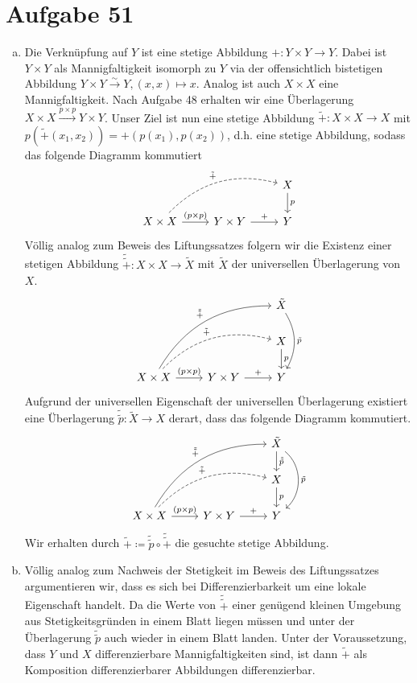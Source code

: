 \documentclass{article}
\begin{document}
\section*{Aufgabe 51}
\begin{enumerate}[(a)]
  \item Die Verknüpfung auf $Y$ ist eine stetige Abbildung $+ \colon Y \times Y \to Y$. 
  Dabei ist $Y \times Y$ als Mannigfaltigkeit isomorph zu $Y$ via der offensichtlich bistetigen Abbildung 
  $Y \times Y \xrightarrow{\sim} Y, (x,x) \mapsto x$.
  Analog ist auch $X\times X$ eine Mannigfaltigkeit. Nach Aufgabe 48 erhalten wir eine Überlagerung 
  $X \times X \xrightarrow{p\times p}Y\times Y$.
  Unser Ziel ist nun eine stetige Abbildung $\tilde{+}\colon X\times X \to X$ mit $p(\tilde{+}(x_1, x_2)) = +(p(x_1), p(x_2))$, d.h.
  eine stetige Abbildung, sodass das folgende Diagramm kommutiert 
  \[
      \begin{tikzcd}
         & & X \arrow[d, "p"]\\
         X \times X\arrow[urr, "\tilde{+}", bend left, dashed] \arrow[r, "(p\times p)"] & Y \times Y\arrow[r, "+"]  & Y
      \end{tikzcd}
  \]
  Völlig analog zum Beweis des Liftungssatzes folgern wir die Existenz einer stetigen Abbildung 
  $\tilde{\tilde{+}} \colon X \times X \to \tilde X$ mit $\tilde X$ der universellen Überlagerung von $X$.
  \[
      \begin{tikzcd}
         & & \tilde X \arrow[dd, bend left, "\tilde p"]\\
         & & X \arrow[d, "p"]\\
         X \times X\arrow[uurr, bend left, "\tilde{\tilde{+}}"] \arrow[urr, "\tilde{+}", bend left, dashed] \arrow[r, "(p\times p)"] & Y \times Y\arrow[r, "+"]  & Y
      \end{tikzcd}
  \]
  Aufgrund der universellen Eigenschaft der universellen Überlagerung existiert eine Überlagerung 
  $\tilde{\tilde{p}} \colon \tilde{X} \to X$ derart, dass das folgende Diagramm kommutiert.
  \[
      \begin{tikzcd}
         & & \tilde X \arrow[d, "\tilde{\tilde{p}}"]\arrow[dd, bend left=50, "\tilde p"]\\
         & & X \arrow[d, "p"]\\
         X \times X\arrow[uurr, bend left, "\tilde{\tilde{+}}"] \arrow[urr, "\tilde{+}", bend left, dashed] \arrow[r, "(p\times p)"] & Y \times Y\arrow[r, "+"]  & Y
      \end{tikzcd}
  \]
  Wir erhalten durch $\tilde{+} \coloneqq \tilde{\tilde{p}} \circ \tilde{\tilde{+}}$ die gesuchte stetige Abbildung.
  \item Völlig analog zum Nachweis der Stetigkeit im Beweis des Liftungssatzes argumentieren wir, dass es sich bei 
  Differenzierbarkeit um eine lokale Eigenschaft handelt. Da die Werte von $\tilde{\tilde{+}}$ einer genügend kleinen Umgebung
  aus Stetigkeitsgründen in einem Blatt liegen müssen und unter der Überlagerung $\tilde{\tilde{p}}$ auch wieder in einem Blatt
  landen. Unter der Voraussetzung, dass $Y$ und $X$ differenzierbare Mannigfaltigkeiten sind, ist dann $\tilde{+}$ als 
  Komposition differenzierbarer Abbildungen differenzierbar.
\end{enumerate}
\end{document}
